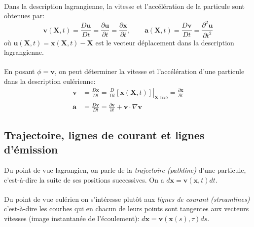 \paragraph{}
Dans la description lagrangienne, la vitesse et l'accélération de la particule sont obtenues par:
$$\textbf{v}(\textbf{X},t)=\frac{D\textbf{u}}{Dt}=\frac{\partial \textbf{u}}{\partial t}=\frac{\partial \textbf{x}}{\partial t},\qquad \textbf{a}(\textbf{X},t)=\frac{D\textbf{v}}{Dt}=\frac{\partial^2\textbf{u}}{\partial t^2}$$ où $\textbf{u}(\textbf{X},t)=\textbf{x}(\textbf{X},t)-\textbf{X}$ est le vecteur déplacement dans la description lagrangienne.
\paragraph{}
En posant $\phi=\textbf{v}$, on peut déterminer la vitesse et l'accélération d'une particule dans la description eulérienne:
$$\begin{aligned}
\textbf{v}&=\frac{D\textbf{x}}{Dt}=\left.\frac{D}{Dt}[\textbf{x}(\textbf{X},t)]\right|_{\textbf{X}\text{ fixé}}=\frac{\partial \textbf{x}}{\partial t}\\
\textbf{a}&=\frac{D\textbf{v}}{Dt}=\frac{\partial \textbf{v}}{\partial t}+\textbf{v}\cdot\nabla\textbf{v}
\end{aligned}$$
\subsection{Trajectoire, lignes de courant et lignes d'émission}
Du point de vue lagrangien, on parle de la \emph{trajectoire (pathline)} d'une particule, c'est-à-dire la suite de ses positions successives. On a $d\textbf{x}=\textbf{v}(\textbf{x},t)dt$.
\paragraph{}
Du point de vue eulérien on s'intéresse plutôt aux \emph{lignes de courant (streamlines)} c'est-à-dire les courbes qui en chacun de leurs points sont tangentes aux vecteurs vitesses (image instantanée de l'écoulement): $d\textbf{x}=\textbf{v}(\textbf{x}(s),\tau)ds$.
